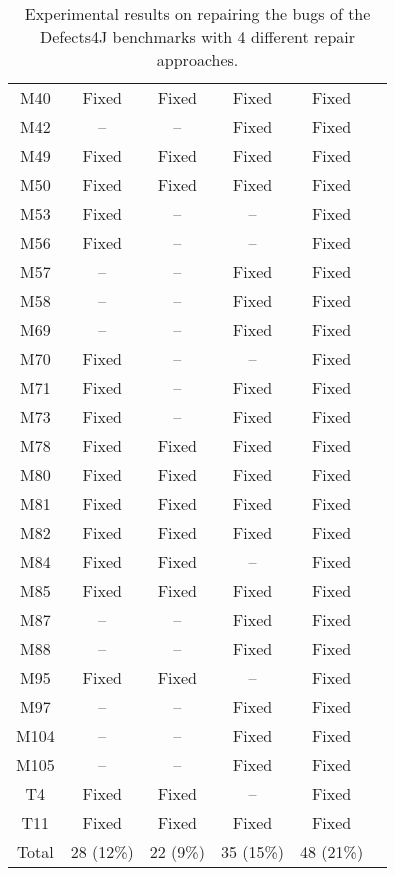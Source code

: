 \begin{table}[!t]
{\begin{tabular}{|c|c|c|c|c|c|}
M40               & Fixed     & Fixed     & Fixed     &Fixed   \\
M42               & --        & --        & Fixed     &Fixed   \\
M49               & Fixed     & Fixed     & Fixed     &Fixed   \\
M50               & Fixed     & Fixed     & Fixed     &Fixed   \\
M53               & Fixed     & --        & --        &Fixed   \\
M56               & Fixed     & --        & --        &Fixed   \\
M57               & --        & --        & Fixed     &Fixed   \\
M58               & --        & --        & Fixed     &Fixed   \\
M69               & --        & --        & Fixed     &Fixed   \\
M70               & Fixed     & --        & --        &Fixed   \\
M71               & Fixed     & --        & Fixed     &Fixed   \\
M73               & Fixed     & --        & Fixed     &Fixed   \\
M78               & Fixed     & Fixed     & Fixed     &Fixed   \\
M80               & Fixed     & Fixed     & Fixed     &Fixed   \\
M81               & Fixed     & Fixed     & Fixed     &Fixed   \\
M82               & Fixed     & Fixed     & Fixed     &Fixed   \\
M84               & Fixed     & Fixed     & --        &Fixed   \\
M85               & Fixed     & Fixed     & Fixed     &Fixed   \\
M87               & --        & --        & Fixed     &Fixed   \\
M88               & --        & --        & Fixed     &Fixed   \\
M95               & Fixed     & Fixed     & --        &Fixed   \\
M97               & --        & --        & Fixed     &Fixed   \\
M104              & --        & --        & Fixed     &Fixed   \\
M105              & --        & --        & Fixed     &Fixed   \\
\hline
T4                & Fixed     & Fixed     & --        &Fixed   \\
T11               & Fixed     & Fixed     & Fixed     &Fixed   \\
\hline
Total             & 28 (12\%) & 22 (9\%)  & 35 (15\%) & 48 (21\%)\\
\hline 
\end{tabular}%
}
\caption{Experimental results on repairing the bugs of the Defects4J benchmarks with 4 different repair approaches.}
\end{table}
